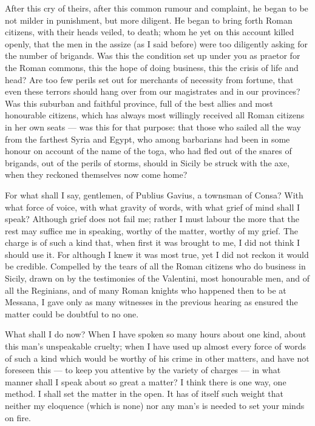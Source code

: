  After this cry of theirs, after this common rumour and complaint, he began to be not milder in punishment, but more diligent. He began to bring forth Roman citizens, with their heads veiled, to death; whom he yet on this account killed openly, that the men in the assize (as I said before) were too diligently asking for the number of brigands. Was this the condition set up under you as praetor for the Roman commons, this the hope of doing business, this the crisis of life and head? Are too few perils set out for merchants of necessity from fortune, that even these terrors should hang over from our magistrates and in our provinces? Was this suburban and faithful province, full of the best allies and most honourable citizens, which has always most willingly received all Roman citizens in her own seats --- was this for that purpose: that those who sailed all the way from the farthest Syria and Egypt, who among barbarians had been in some honour on account of the name of the toga, who had fled out of the snares of brigands, out of the perils of storms, should in Sicily be struck with the axe, when they reckoned themselves now come home?

 For what shall I say, gentlemen, of Publius Gavius, a townsman of Consa? With what force of voice, with what gravity of words, with what grief of mind shall I speak? Although grief does not fail me; rather I must labour the more that the rest may suffice me in speaking, worthy of the matter, worthy of my grief. The charge is of such a kind that, when first it was brought to me, I did not think I should use it. For although I knew it was most true, yet I did not reckon it would be credible. Compelled by the tears of all the Roman citizens who do business in Sicily, drawn on by the testimonies of the Valentini, most honourable men, and of all the Reginians, and of many Roman knights who happened then to be at Messana, I gave only as many witnesses in the previous hearing as ensured the matter could be doubtful to no one.

 What shall I do now? When I have spoken so many hours about one kind, about this man's unspeakable cruelty; when I have used up almost every force of words of such a kind which would be worthy of his crime in other matters, and have not foreseen this --- to keep you attentive by the variety of charges --- in what manner shall I speak about so great a matter? I think there is one way, one method. I shall set the matter in the open. It has of itself such weight that neither my eloquence (which is none) nor any man's is needed to set your minds on fire.

